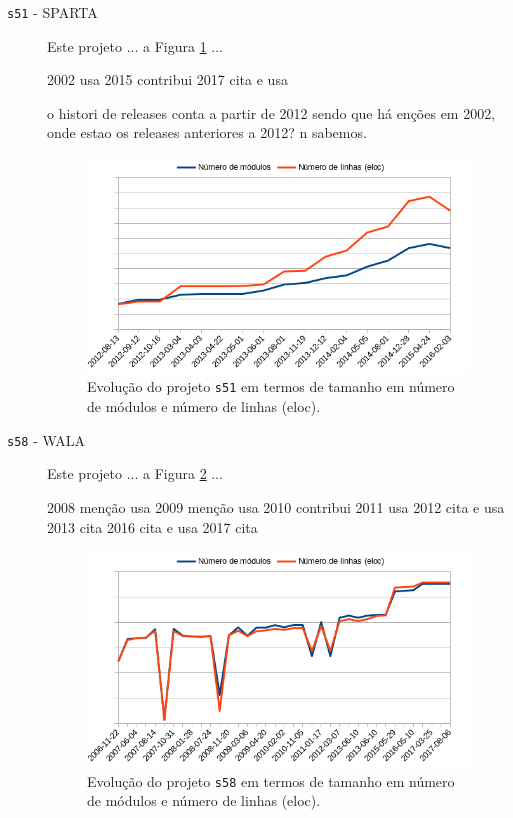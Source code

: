 \begin{description}
  \item[\texttt{s51} - SPARTA]
    Este projeto ... a Figura \ref{modules-eloc-s51} ...

2002	usa
2015	contribui
2017	cita e usa

o histori de releases conta a partir de 2012 sendo
que há enções em 2002, onde estao os releases
anteriores a 2012? n sabemos.

\begin{figure}[h]
  \centering
  \includegraphics[scale=0.6]{imagens/modules-eloc-s51.png}
  \caption{Evolução do projeto \texttt{s51} em termos de tamanho em número de módulos e número de linhas (eloc).}
  \label{modules-eloc-s51}
\end{figure}

  \item[\texttt{s58} - WALA]
    Este projeto ... a Figura \ref{modules-eloc-s58} ...

2008	menção usa
2009	menção usa
2010	contribui
2011	usa
2012	cita e usa
2013	cita
2016	cita e usa
2017	cita

\begin{figure}[h]
  \centering
  \includegraphics[scale=0.6]{imagens/modules-eloc-s58.png}
  \caption{Evolução do projeto \texttt{s58} em termos de tamanho em número de módulos e número de linhas (eloc).}
  \label{modules-eloc-s58}
\end{figure}

\end{description}

